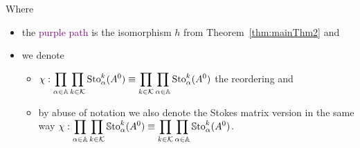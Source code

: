 Where
\begin{itemize}
  \item the \textcolor{purple}{purple path} is the isomorphism $h$ from
    Theorem~\ref{thm:mainThm2} and
  \item we denote
    \begin{itemize}
      \item $\chi:\displaystyle \prod_{\alpha\in\mathbb{A}}\prod_{k\in\mathcal{K}}\operatorname{Sto}_\alpha^k(A^0)
        \equiv\displaystyle \prod_{k\in\mathcal{K}}\prod_{\alpha\in\mathbb{A}}\operatorname{Sto}_\alpha^k(A^0)$
        the reordering and
      \item by abuse of notation we also denote the Stokes matrix version in
        the same way
        $\chi:\displaystyle \prod_{\alpha\in\mathbb{A}}\prod_{k\in\mathcal{K}}\operatorname{\mathbb{S}to}_\alpha^k(A^0)
        \equiv\displaystyle
        \prod_{k\in\mathcal{K}}\prod_{\alpha\in\mathbb{A}}\operatorname{\mathbb{S}to}_\alpha^k(A^0)$.
    \end{itemize}
\end{itemize}
